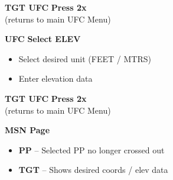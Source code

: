 \documentclass[fontInter]{TechCheck}
\begin{document}
\begin{longtablenumerate}
{\begin{subenumerate}
			\item \textbf{TGT UFC} \dotfill \textbf{Press 2x} \\
			\hfill (returns to main UFC Menu)
			\item \textbf{UFC} \dotfill \textbf{Select ELEV}
			\begin{itemize}
				\item Select desired unit (FEET / MTRS)
				\item Enter elevation data
			\end{itemize}
			\item \textbf{TGT UFC} \dotfill \textbf{Press 2x} \\
			\hfill (returns to main UFC Menu)
			\item \textbf{MSN Page}
			\begin{itemize}
				\item \textbf{PP} -- Selected PP no longer crossed out
				\item \textbf{TGT} -- Shows desired coords / elev data 	
			\end{itemize}
		\end{subenumerate}}
	\end{longtablenumerate}

	\clearpage
\end{document}
